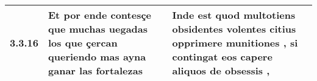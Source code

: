 \begin{tabular}{|p{1cm}|p{6.5cm}|p{6.5cm}|}

\hline
3.3.16 & Et por ende contesçe que muchas uegadas \textbf{ los que çercan queriendo } mas ayna ganar las fortalezas & Inde est quod multotiens obsidentes \textbf{ volentes citius opprimere munitiones , } si contingat eos capere aliquos de obsessis , \\\hline

\end{tabular}

